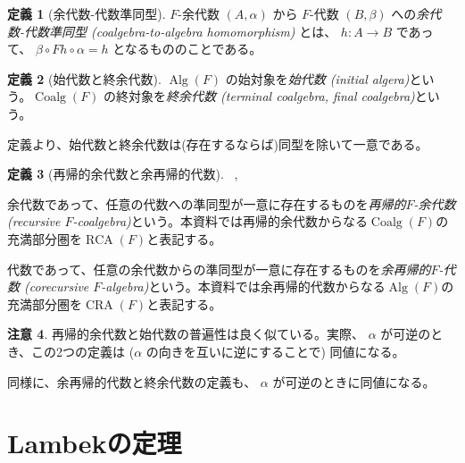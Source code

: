 \documentclass[dvipdfmx,uplatex,papersize,a4paper,10pt]{jsarticle}
\theoremstyle{definition}
\newtheorem{definition}{定義}[section]
\newtheorem{remark}[definition]{注意}
\DeclareMathOperator{\Alg}{Alg}
\DeclareMathOperator{\Coalg}{Coalg}
\DeclareMathOperator{\RCA}{RCA}
\DeclareMathOperator{\CRA}{CRA}
\begin{document}
\begin{definition}[余代数-代数準同型]
  $F$-余代数 $(A, \alpha)$ から $F$-代数 $(B, \beta)$ への\emph{余代数-代数準同型 (coalgebra-to-algebra homomorphism)} とは、 $h \colon A \to B$ であって、 $\beta \circ Fh \circ \alpha = h$ となるもののことである。

\end{definition}

\begin{definition}[始代数と終余代数]
  $\Alg(F)$ の始対象を\emph{始代数 (initial algera)}という。$\Coalg(F)$ の終対象を\emph{終余代数 (terminal coalgebra, final coalgebra)}という。

  定義より、始代数と終余代数は(存在するならば)同型を除いて一意である。
\end{definition}

\begin{definition}[再帰的余代数と余再帰的代数]~\cite{MR0364389},~\cite{DBLP:conf/sbmf/CaprettaUV09}

  余代数であって、任意の代数への準同型が一意に存在するものを\emph{再帰的$F$-余代数 (recursive $F$-coalgebra)}という。本資料では再帰的余代数からなる$\Coalg(F)$の充満部分圏を$\RCA(F)$と表記する。

  代数であって、任意の余代数からの準同型が一意に存在するものを\emph{余再帰的$F$-代数 (corecursive $F$-algebra)}という。本資料では余再帰的代数からなる$\Alg(F)$の充満部分圏を$\CRA(F)$と表記する。
\end{definition}

\begin{remark}
  再帰的余代数と始代数の普遍性は良く似ている。実際、 $\alpha$ が可逆のとき、この2つの定義は ($\alpha$ の向きを互いに逆にすることで) 同値になる。

  同様に、余再帰的代数と終余代数の定義も、 $\alpha$ が可逆のときに同値になる。
\end{remark}

\section{Lambekの定理}
\end{document}
